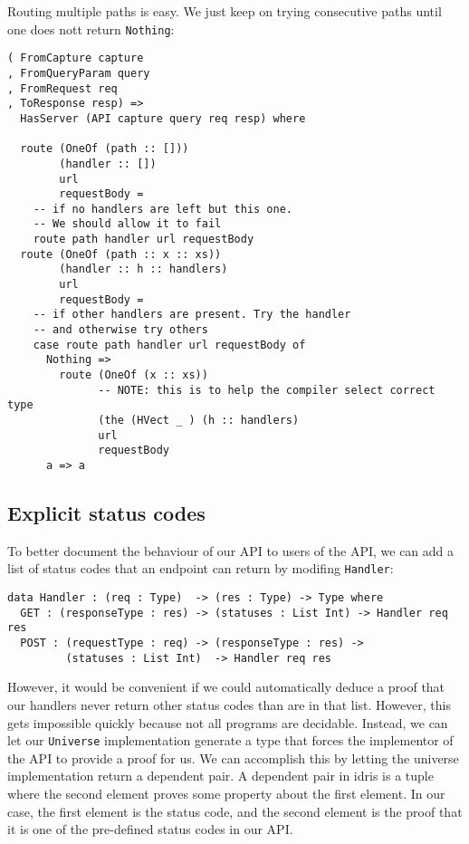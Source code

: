 \documentclass[12pt,a4paper]{article}
\begin{document}
Routing multiple paths is easy. We just keep on trying consecutive paths until one
does nott return \texttt{Nothing}:
\begin{verbatim}
( FromCapture capture
, FromQueryParam query
, FromRequest req
, ToResponse resp) =>
  HasServer (API capture query req resp) where

  route (OneOf (path :: []))
        (handler :: [])
        url
        requestBody =
    -- if no handlers are left but this one.
    -- We should allow it to fail
    route path handler url requestBody
  route (OneOf (path :: x :: xs))
        (handler :: h :: handlers)
        url
        requestBody =
    -- if other handlers are present. Try the handler
    -- and otherwise try others
    case route path handler url requestBody of
      Nothing =>
        route (OneOf (x :: xs))
              -- NOTE: this is to help the compiler select correct type
              (the (HVect _ ) (h :: handlers)
              url
              requestBody
      a => a
\end{verbatim}

\subsection{Explicit status codes}
To better document the behaviour of our API to users of the API, we can add a list of status codes that an endpoint can return by modifing \texttt{Handler}:

\begin{verbatim}
data Handler : (req : Type)  -> (res : Type) -> Type where
  GET : (responseType : res) -> (statuses : List Int) -> Handler req res
  POST : (requestType : req) -> (responseType : res) ->
         (statuses : List Int)  -> Handler req res
\end{verbatim}

However, it would be convenient if we could automatically deduce a proof that our handlers never return
other status codes than are in that list. However, this gets impossible quickly because not all programs are decidable.
Instead, we can let our \texttt{Universe} implementation generate a type that forces the implementor of the API to provide a proof for us. We can accomplish this by letting the universe implementation return a dependent pair. A dependent pair in idris is a tuple where the second element proves some property about the first element. In our case, the first element is the status code, and the second element is the proof that it is one of the pre-defined status codes in our API.
\end{document}
